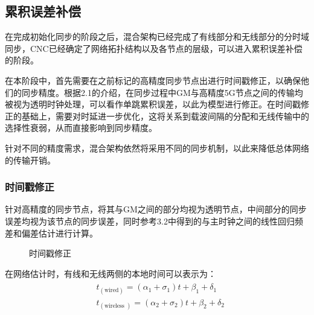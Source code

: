 \documentclass[UTF8,a4paper,12pt]{ctexart}
\numberwithin{equation}{section}
\begin{document}
\subsection{累积误差补偿}
在完成初始化同步的阶段之后，混合架构已经完成了有线部分和无线部分的分时域同步，CNC已经确定了网络拓扑结构以及各节点的层级，可以进入累积误差补偿的阶段。

在本阶段中，首先需要在之前标记的高精度同步节点出进行时间戳修正，以确保他们的同步精度。根据2.1的介绍，在同步过程中GM与高精度5G节点之间的传输均被视为透明时钟处理，可以看作单跳累积误差，以此为模型进行修正。在时间戳修正的基础上，需要对时延进一步优化，这将关系到载波间隔的分配和无线传输中的选择性衰弱，从而直接影响到同步精度。

针对不同的精度需求，混合架构依然将采用不同的同步机制，以此来降低总体网络的传输开销。
\subsubsection{时间戳修正}
针对高精度的同步节点，将其与GM之间的部分均视为透明节点，中间部分的同步误差均视为该节点的同步误差，同时参考3.2中得到的与主时钟之间的线性回归频差和偏差估计进行计算。
\begin{figure}[htb]
	\caption{\label{1} 时间戳修正}
\end{figure}
在网络估计时，有线和无线两侧的本地时间可以表示为：
\vspace{-10mm}
\begin{eqnarray}
	\begin{aligned}
		&t_{(\text {wired})}=\left(\alpha_{1}+\sigma_{1}\right) t+\beta_{1}+\delta_{1}\\
		&t_{(\text {wireless })}=\left(\alpha_{2}+\sigma_{2}\right) t+\beta_{2}+\delta_{2}\\
	\end{aligned}
\end{eqnarray}
\end{document}
